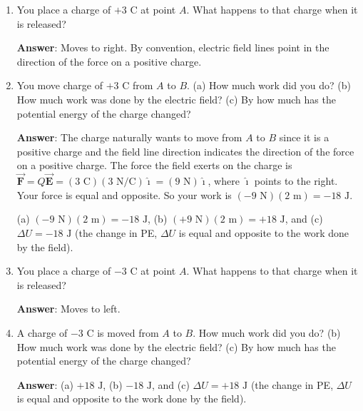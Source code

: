 \documentclass{article}
\newcommand{\ihat}[0]{\hat{\boldsymbol{\imath}}}
\newcommand{\bfvec}[1]{\vec{\mathbf{#1}}}
\begin{document}
\begin{enumerate}

  \item You place a charge of $+3\text{ C}$ at point $A$. What happens to that charge when it is released?

     \ifsolutions
       {\bf Answer}: Moves to right. By convention, electric field lines point in the direction of the force on a positive charge.
     \else
       \vskip 36pt
     \fi
     \ifsolutions\else
     \vskip 36pt
     \fi

  \item You move charge of $+3\text{ C}$ from $A$ to $B$. (a) How much work did you do? (b) How much work was done by the electric field? (c) By how much has the potential energy of the charge changed?

     \ifsolutions
       {\bf Answer}: The charge naturally wants to move from $A$ to $B$ since it is a positive charge and the field line direction indicates the direction of the force on a positive charge. The force the field exerts on the charge is $\bfvec{F}=Q\bfvec{E}=(3\text{ C})(3\text { N/C})\ihat = (9\text{ N})\ihat$, where $\ihat$ points to the right. Your force is equal and opposite. So your work is $(-9\text{ N})(2\text{ m}) = -18 \text{ J}$.

       (a) $(-9 \text{ N})(2\text { m})=-18\text{ J}$, (b) $(+9 \text{ N})(2\text { m})=+18\text{ J}$, and (c) $\Delta U = -18\text{ J}$ (the change in PE, $\Delta U$ is equal and opposite to the work done by the field).
     \else
       \vskip 36pt
     \fi
     \ifsolutions\else
     \vskip 36pt
     \fi

  \item You place a charge of $-3\text{ C}$ at point $A$. What happens to that charge when it is released?

     \ifsolutions
       {\bf Answer}: Moves to left.
     \else
       \vskip 48pt
     \fi
     \ifsolutions\else
     \vskip 48pt
     \fi

  \item A charge of $-3\text{ C}$ is moved from $A$ to $B$. How much work did you do? (b) How much work was done by the electric field? (c) By how much has the potential energy of the charge changed?

     \ifsolutions
       {\bf Answer}: (a) $+18\text{ J}$, (b) $-18\text{ J}$, and (c) $\Delta U = +18\text{ J}$ (the change in PE, $\Delta U$ is equal and opposite to the work done by the field).
     \else
       \vskip 48pt
     \fi
     \ifsolutions\else
     \vskip 48pt
     \fi


\end{enumerate}
\end{document}
